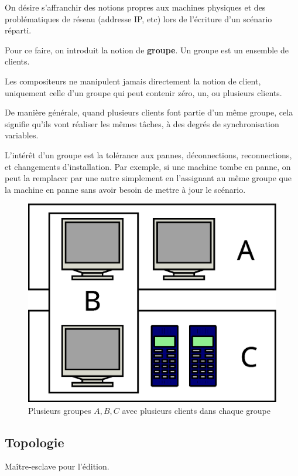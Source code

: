 \documentclass{article}
\newcommand\vocab[1]{\textbf{#1}}
\begin{document}
On désire s'affranchir des notions propres aux machines physiques et des problématiques de réseau (addresse IP, etc) lors de l'écriture 
d'un scénario réparti. 

Pour ce faire, on introduit la notion de \vocab{groupe}. 
Un groupe est un ensemble de clients.

Les compositeurs ne manipulent jamais directement la notion de client, uniquement celle d'un groupe qui peut contenir zéro, un, ou plusieurs clients.

De manière générale, quand plusieurs clients font partie d'un même groupe, cela signifie qu'ils vont réaliser les mêmes tâches, à des degrés de synchronisation variables.

L'intérêt d'un groupe est la tolérance aux pannes, déconnections, reconnections, et changements d'installation. 
Par exemple, si une machine tombe en panne, on peut la remplacer par une autre simplement en l'assignant au même groupe que la machine en panne 
sans avoir besoin de mettre à jour le scénario.


\begin{figure}[h]
	\centering
	\includegraphics[scale=0.2]{images/groupes.eps}
	\caption{Plusieurs groupes $A,B,C$ avec plusieurs clients dans chaque groupe}
	\label{img.groupes}
\end{figure}


\subsection{Topologie}
Maître-esclave pour l'édition.
\end{document}

